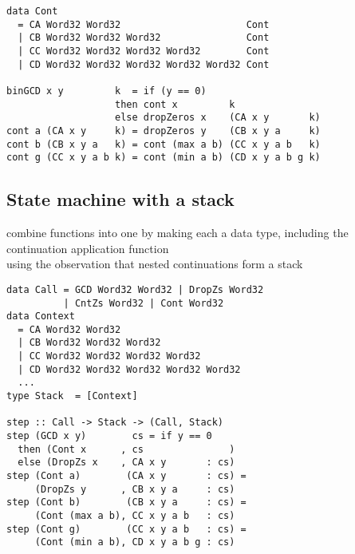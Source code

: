 \documentclass[preprint]{sigplanconf}
\def\codefamily{\sffamily\normalsize}
\def\codesmall{\sffamily\small}
\begin{document}
\lstset{basicstyle=\codesmall}
\begin{lstlisting}
data Cont
  = CA Word32 Word32                      Cont
  | CB Word32 Word32 Word32               Cont
  | CC Word32 Word32 Word32 Word32        Cont
  | CD Word32 Word32 Word32 Word32 Word32 Cont

binGCD x y         k  = if (y == 0)
                   then cont x         k
                   else dropZeros x    (CA x y       k)
cont a (CA x y     k) = dropZeros y    (CB x y a     k)
cont b (CB x y a   k) = cont (max a b) (CC x y a b   k)
cont g (CC x y a b k) = cont (min a b) (CD x y a b g k)
\end{lstlisting}
\lstset{basicstyle=\codefamily}

\subsection{State machine with a stack}
combine functions into one by making each a data type, including the continuation application function \\
using the observation that nested continuations form a stack

\begin{lstlisting}
data Call = GCD Word32 Word32 | DropZs Word32
          | CntZs Word32 | Cont Word32
data Context
  = CA Word32 Word32
  | CB Word32 Word32 Word32
  | CC Word32 Word32 Word32 Word32
  | CD Word32 Word32 Word32 Word32 Word32
  ...
type Stack  = [Context]

step :: Call -> Stack -> (Call, Stack)
step (GCD x y)        cs = if y == 0
  then (Cont x      , cs               )
  else (DropZs x    , CA x y       : cs)
step (Cont a)        (CA x y       : cs) =
     (DropZs y      , CB x y a     : cs)
step (Cont b)        (CB x y a     : cs) =
     (Cont (max a b), CC x y a b   : cs)
step (Cont g)        (CC x y a b   : cs) =
     (Cont (min a b), CD x y a b g : cs)
\end{lstlisting}
\end{document}
